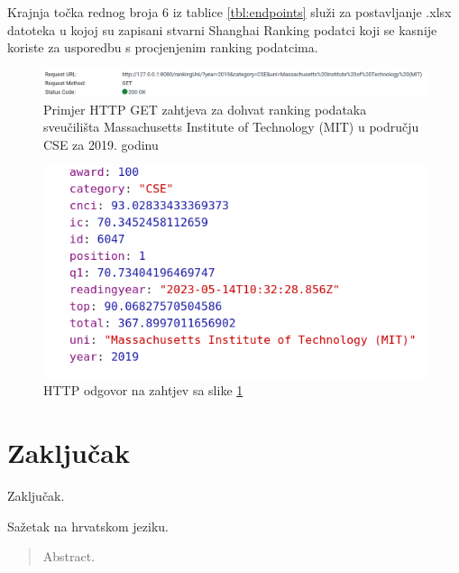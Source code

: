 \documentclass[times, utf8, zavrsni]{fer}
\begin{document}
Krajnja točka rednog broja 6 iz tablice \ref{tbl:endpoints} služi za postavljanje .xlsx datoteka u kojoj su zapisani stvarni Shanghai Ranking podatci 
koji se kasnije koriste za usporedbu s procjenjenim ranking podatcima.\\
\begin{figure}[htb]
    \centering
       \includegraphics[scale=0.36]{get1.png} 
       \caption{Primjer HTTP GET zahtjeva za dohvat ranking podataka sveučilišta Massachusetts Institute of Technology (MIT) u području CSE za 2019. godinu}
       \label{fig:get1}
       \end{figure}
\begin{figure}[htb]
        \centering
           \includegraphics[scale=0.4]{get2.png} 
           \caption{HTTP odgovor na zahtjev sa slike \ref{fig:get1}}
           \label{fig:get2}
           \end{figure}

\chapter{Zaključak}
Zaključak.




\begin{sazetak}
Sažetak na hrvatskom jeziku.

\end{sazetak}

\begin{abstract}
Abstract.

\end{abstract}
\end{document}
